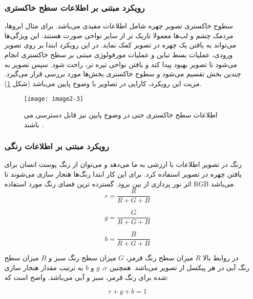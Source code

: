 \subsubsection{رویکرد مبتنی بر اطلاعات سطح خاکستری} 
سطوح خاکستری  تصویر چهره شامل اطلاعات مفیدی می‌باشد. برای مثال ابرو‌ها، مردمک چشم و لب‌ها معمولا تاریک تر از سایر نواحی صورت هستند. این ویژگی‌ها می‌تواند به یافتن یک چهره در تصویر کمک نماید. در این رویکرد ابتدا بر روی تصویر ورودی، عملیات بسط تباین  و عملیات مورفولوژی  مبتنی بر سطح خاکستری انجام می‌شود تا تصویر بهبود پیدا کند و یافتن نواحی تیره تر، راحت شود. سپس تصویر به چندین بخش تقسیم می‌شود و سطوح خاکستری بخش‌ها مورد بررسی قرار می‌گیرد. مزیت این رویکرد، کارایی در تصاویر با وضوح پایین می‌باشد (شکل \ref{image2-3}).

\begin{figure}[h]
\centering
  \texttt{[image: image2-3]}
  \caption{اطلاعات سطح خاکستری حتی در وضوح پایین نیز قابل دسترسی می باشند  \cite{HJELMAS2001236}.}
  \label{image2-3}
\end{figure}

\subsubsection{رویکرد مبتنی بر اطلاعات رنگی}
رنگ در تصویر اطلاعات با ارزشی به ما می‌دهد و می‌توان از رنگ پوست انسان برای یافتن چهره در تصویر استفاده کرد. برای این کار ابتدا رنگ‌ها هنجار سازی  می‌شوند تا اثر نور پردازی از بین برود. گسترده ترین فضای رنگ مورد استفاده RGB می‌باشد.
\begin{equation}\label{eq2-1}
r = \frac{R}{R + G + B}
\end{equation}

\begin{equation}\label{eq2-2}
g = \frac{G}{R + G + B}
\end{equation}

\begin{equation}\label{eq2-3}
b = \frac{B}{R + G + B}
\end{equation}

در روابط بالا $R$ میزان سطح رنگ قرمز، $G$ میزان سطح رنگ سبز و $B$ میزان سطح رنگ آبی در هر پیکسل از تصویر می‌باشد. همچنین $r$، $g$ و $b$ به ترتیب مقدار هنجار سازی شده برای رنگ قرمز، سبز و آبی می‌باشد. واضح است که:

\begin{equation}\label{eq2-4}
r + g + b = 1
\end{equation}
 	
